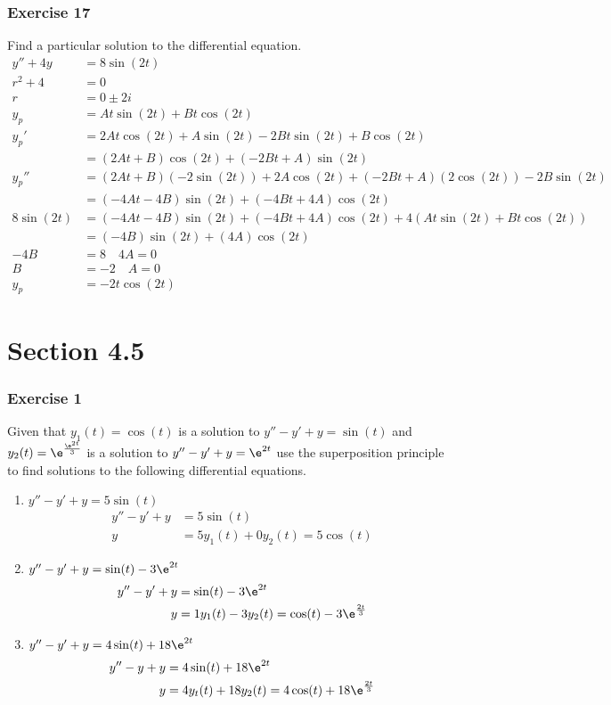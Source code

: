 \documentclass{math}
\begin{document}
\subsubsection*{Exercise 17}
Find a particular solution to the differential equation.
\begin{align*}
  y''+4y &= 8\sin(2t) \\
  r^2+4 &= 0 \\
  r &= 0\pm2i \\
  y_p &= At\sin(2t)+Bt\cos(2t) \\
  y_p' &= 2At\cos(2t)+A\sin(2t)-2Bt\sin(2t)+B\cos(2t) \\
  &= (2At+B)\cos(2t)+(-2Bt+A)\sin(2t) \\
  y_p'' &= (2At+B)(-2\sin(2t))+2A\cos(2t)+(-2Bt+A)(2\cos(2t))-2B\sin(2t) \\
  &= (-4At-4B)\sin(2t)+(-4Bt+4A)\cos(2t) \\
  8\sin(2t) &= (-4At-4B)\sin(2t)+(-4Bt+4A)\cos(2t)+4(At\sin(2t)+Bt\cos(2t)) \\
  &= (-4B)\sin(2t)+(4A)\cos(2t) \\
  -4B &= 8 \quad 4A = 0 \\
  B &= -2 \quad A = 0 \\
  y_p &= -2t\cos(2t)
\end{align*}

\section*{Section 4.5}

\subsubsection*{Exercise 1}
Given that \( y_1(t) = \cos(t) \) is a solution to \( y''-y'+y = \sin(t) \) and
\( y_2(t) = \e^{\frac{\e^{2t}}{3}} \) is a solution to \( y''-y'+y = \e^{2t} \)
use the superposition principle to find solutions to the following differential
equations.
\begin{enumerate}
  \item \( y''-y'+y = 5\sin(t) \)
  \begin{align*}
    y''-y'+y &= 5\sin(t) \\
    y &= 5y_1(t)+0y_2(t) = 5\cos(t)
  \end{align*}
  \item \( y''-y'+y = \sin(t)-3\e^{2t} \)
  \begin{align*}
    y''-y'+y &= \sin(t)-3\e^{2t} \\
    y &= 1y_1(t)-3y_2(t) = \cos(t)-3\e^{\frac{2t}{3}}
  \end{align*}
  \item \( y''-y'+y = 4\sin(t)+18\e^{2t} \)
  \begin{align*}
    y''-y+y &= 4\sin(t)+18\e^{2t} \\
    y &= 4y_t(t)+18y_2(t) = 4\cos(t)+18\e^{\frac{2t}{3}}
  \end{align*}
\end{enumerate}
\end{document}

